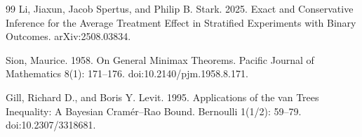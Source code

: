 \documentclass{article}
\begin{document}
\begin{thebibliography}{99}
   Li, Jiaxun, Jacob Spertus, and Philip B. Stark. 2025. Exact and Conservative Inference for the Average Treatment Effect in Stratified Experiments with Binary Outcomes. arXiv:2508.03834.

   Sion, Maurice. 1958. On General Minimax Theorems. Pacific Journal of Mathematics 8(1): 171--176. doi:10.2140/pjm.1958.8.171.

   Gill, Richard D., and Boris Y. Levit. 1995. Applications of the van Trees Inequality: A Bayesian Cramér--Rao Bound. Bernoulli 1(1/2): 59--79. doi:10.2307/3318681.

\end{thebibliography}
\end{document}
